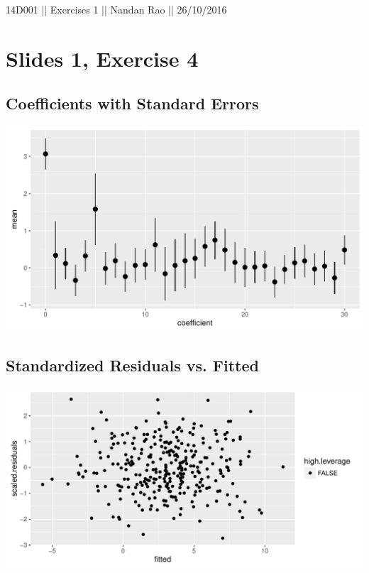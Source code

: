 \documentclass[a4paper,12pt]{article}\usepackage[]{graphicx}\usepackage[]{color}
\makeatletter
\def\maxwidth{ %
  \ifdim\Gin@nat@width>\linewidth
    \linewidth
  \else
    \Gin@nat@width
  \fi
}
\newenvironment{knitrout}{}{} %
\makeatother
\begin{document}
\normalsize 14D001 || Exercises 1 || Nandan Rao || 26/10/2016

\section{Slides 1, Exercise 4}

\subsection{ Coefficients with Standard Errors }

\begin{knitrout}
\color{fgcolor}
\includegraphics[width=\maxwidth]{figure/coefficients-1} 

\end{knitrout}


\subsection{ Standardized Residuals vs. Fitted  }

\begin{knitrout}
\color{fgcolor}
\includegraphics[width=\maxwidth]{figure/high_leverage-1} 

\end{knitrout}
\end{document}
